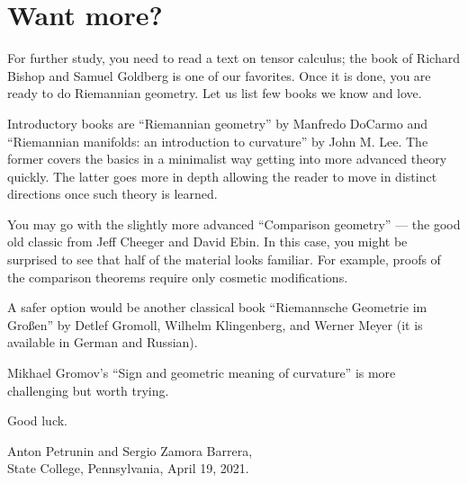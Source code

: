 \chapter*{Want more?}



For further study, you need to read a text on tensor calculus;
the book of Richard Bishop and Samuel Goldberg \cite{bishop-goldberg} is one of our favorites.
Once it is done, you are ready to do Riemannian geometry.
Let us list few books we know and love.

Introductory books are ``Riemannian geometry'' \cite{carmo1992riemannian} by Manfredo DoCarmo and ``Riemannian manifolds: an introduction to curvature''  \cite{lee2006riemannian} by John M. Lee. The former covers the basics in a minimalist way getting into more advanced theory quickly. The latter goes more in depth allowing the reader to move in distinct directions once such theory is learned.



You may go with the slightly more advanced ``Comparison geometry'' \cite{cheeger-ebin} --- the good old classic from Jeff Cheeger and David Ebin. 
In this case, you might be surprised to see that half of the material looks familiar.
For example, proofs of the comparison theorems require only cosmetic modifications.


A safer option would be another classical book ``Riemannsche Geometrie im Großen'' \cite{gromoll-klingenberg-meyer} by 
Detlef Gromoll,
Wilhelm Klingenberg, 
and  Werner Meyer (it is available in German and Russian).

Mikhael Gromov's ``Sign and geometric meaning of curvature'' \cite{gromov-1991} is more challenging but worth trying.

Good luck.

\begin{flushright}
Anton Petrunin and Sergio Zamora Barrera,\\
State College, Pennsylvania, April 19, 2021.
\end{flushright}
